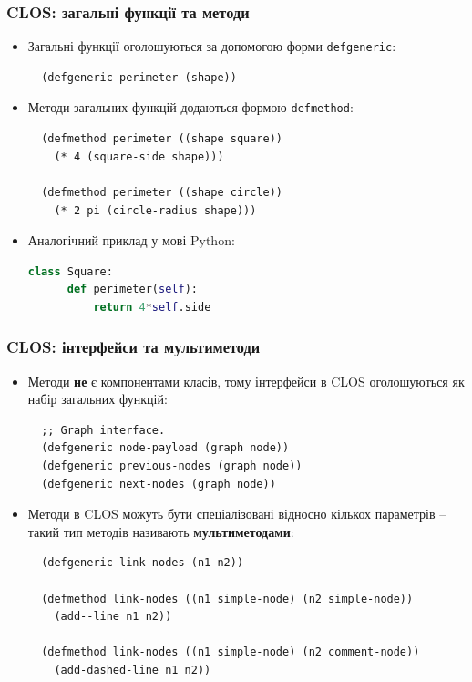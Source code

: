 \documentclass{beamer}
\begin{document}
\begin{frame}[fragile]
  \frametitle{CLOS: загальні функції та методи}
  \begin{itemize}
  \item Загальні функції оголошуються за допомогою форми \texttt{defgeneric}:
    \begin{lstlisting}
  (defgeneric perimeter (shape))
    \end{lstlisting}
  \item Методи загальних функцій додаються формою \texttt{defmethod}:
    \begin{lstlisting}
  (defmethod perimeter ((shape square))
    (* 4 (square-side shape)))

  (defmethod perimeter ((shape circle))
    (* 2 pi (circle-radius shape)))
    \end{lstlisting}
  \item Аналогічний приклад у мові Python:
    \begin{lstlisting}[language=Python]
  class Square:
      def perimeter(self): 
          return 4*self.side
    \end{lstlisting}
  \end{itemize}
\end{frame}

\begin{frame}[fragile]
  \frametitle{CLOS: інтерфейси та мультиметоди}
  \begin{itemize}
  \item Методи \textbf{не} є компонентами класів, тому інтерфейси в CLOS
    оголошуються як набір загальних функцій:
    \begin{lstlisting}
  ;; Graph interface.
  (defgeneric node-payload (graph node))
  (defgeneric previous-nodes (graph node))
  (defgeneric next-nodes (graph node))
    \end{lstlisting}
  \item Методи в CLOS можуть бути спеціалізовані відносно кількох параметрів --
    такий тип методів називають \textbf{мультиметодами}:
    \begin{lstlisting}
  (defgeneric link-nodes (n1 n2))

  (defmethod link-nodes ((n1 simple-node) (n2 simple-node))
    (add--line n1 n2))

  (defmethod link-nodes ((n1 simple-node) (n2 comment-node))
    (add-dashed-line n1 n2))
    \end{lstlisting}
  \end{itemize}
\end{frame}
\end{document}
